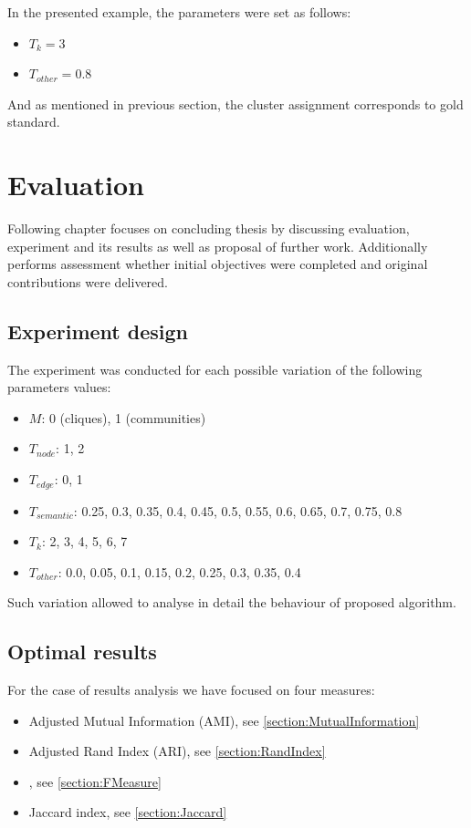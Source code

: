 \documentclass[a4paper, 12pt, oneside]{Thesis} %
\begin{document}
In the presented example, the parameters were set as follows:
\begin{itemize}
    \item $T_{k} = 3$
    \item $T_{other} = 0.8$
\end{itemize}

And as mentioned in previous section, the cluster assignment corresponds to gold standard.

\chapter{Evaluation} Following chapter focuses on concluding thesis by discussing evaluation, experiment and its results as well as proposal of further work. Additionally performs assessment whether initial objectives were completed and original contributions were delivered.

\section{Experiment design}

The experiment was conducted for each possible variation of the following parameters values:

\begin{itemize}
    \item $M$: 0 (cliques), 1 (communities)
    \item $T_{node}$: 1, 2
    \item $T_{edge}$: 0, 1
    \item $T_{semantic}$: 0.25, 0.3, 0.35, 0.4, 0.45, 0.5, 0.55, 0.6, 0.65, 0.7, 0.75, 0.8
    \item $T_{k}$: 2, 3, 4, 5, 6, 7
    \item $T_{other}$: 0.0, 0.05, 0.1, 0.15, 0.2, 0.25, 0.3, 0.35, 0.4
\end{itemize}

Such variation allowed to analyse in detail the behaviour of proposed algorithm.

\section{Optimal results}\label{section:optimal}

For the case of results analysis we have focused on four measures:
\begin{itemize}
    \item Adjusted Mutual Information (AMI), see \ref{section:MutualInformation}
    \item Adjusted Rand Index (ARI), see \ref{section:RandIndex}
    \item {}, see \ref{section:FMeasure}
    \item Jaccard index, see \ref{section:Jaccard}
\end{itemize}
\end{document}
